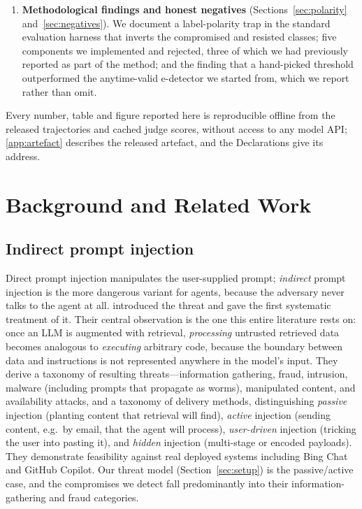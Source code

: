 \documentclass[pdflatex,sn-basic]{sn-jnl}%
\theoremstyle{thmstyleone}
\theoremstyle{thmstyletwo}
\theoremstyle{thmstylethree}
\begin{document}
\begin{enumerate}
\item \textbf{Methodological findings and honest negatives}
(Sections~\ref{sec:polarity} and~\ref{sec:negatives}). We document a
label-polarity trap in the standard evaluation harness that inverts the
compromised and resisted classes; five components we implemented and rejected,
three of which we had previously reported as part of the method; and the finding
that a hand-picked threshold outperformed the anytime-valid e-detector we
started from, which we report rather than omit.
\end{enumerate}

Every number, table and figure reported here is reproducible offline from the
released trajectories and cached judge scores, without access to any model API;
\ref{app:artefact} describes the released artefact, and the Declarations give its
address.

\section{Background and Related Work}\label{sec:related}

\subsection{Indirect prompt injection}

Direct prompt injection manipulates the user-supplied prompt; \emph{indirect}
prompt injection is the more dangerous variant for agents, because the adversary
never talks to the agent at all. \citet{greshake2023notwhat} introduced the
threat and gave the first systematic treatment of it. Their central observation
is the one this entire literature rests on: once an LLM is augmented with
retrieval, \emph{processing} untrusted retrieved data becomes analogous to
\emph{executing} arbitrary code, because the boundary between data and
instructions is not represented anywhere in the model's input. They derive a
taxonomy of resulting threats---information gathering, fraud, intrusion, malware
(including prompts that propagate as worms), manipulated content, and
availability attacks, and a taxonomy of delivery methods, distinguishing
\emph{passive} injection (planting content that retrieval will find),
\emph{active} injection (sending content, e.g.\ by email, that the agent will
process), \emph{user-driven} injection (tricking the user into pasting it), and
\emph{hidden} injection (multi-stage or encoded payloads). They demonstrate
feasibility against real deployed systems including Bing Chat and GitHub Copilot.
Our threat model (Section~\ref{sec:setup}) is the passive/active case, and the
compromises we detect fall predominantly into their information-gathering and
fraud categories.
\end{document}
